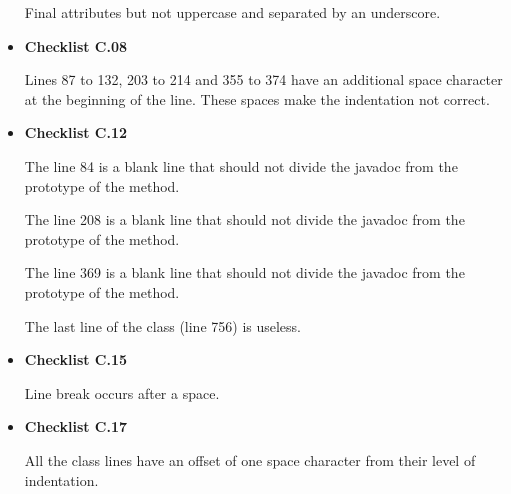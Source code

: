 \documentclass[../../../../codeInspection.tex]{subfiles}
\begin{document}
\begin{itemize}
		    	  

		    	  

		    	  

		    	  Final attributes but not uppercase and separated by an underscore.

		    \item \textbf{Checklist C.08}

		    	  Lines 87 to 132, 203 to 214 and 355 to 374 have an additional space character at the beginning of the line. These spaces make the indentation not correct.

		    \item \textbf{Checklist C.12}

		    	  

		    	  The line 84 is a blank line that should not divide the javadoc from the prototype of the method.

		    	  

		    	  The line 208 is a blank line that should not divide the javadoc from the prototype of the method.

		    	  

		    	  The line 369 is a blank line that should not divide the javadoc from the prototype of the method.

		    	  The last line of the class (line 756) is useless.

		    \item \textbf{Checklist C.15}

		    	  

		    	  Line break occurs after a space.

		    \item \textbf{Checklist C.17}

		    	  All the class lines have an offset of one space character from their level of indentation.


\end{itemize}
\end{document}
